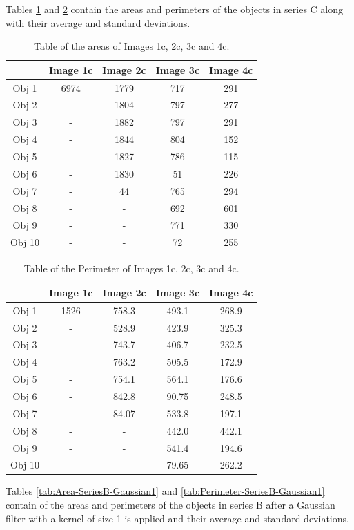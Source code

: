 \documentclass[runningheads]{llncs}
\begin{document}
\newpage
\par Tables \ref{tab:Area-Series C} and \ref{tab:Perimeter-Series C} contain the areas and perimeters of the objects in series C along with their average and standard deviations. 
\begin{table}[h!]
\centering
\begin{tabular}{|c|c|c|c|c|}
\hline
\textbf{} & \textbf{Image 1c} & \textbf{Image 2c} & \textbf{Image 3c} & \textbf{Image 4c} \\
\hline
Obj 1 & 6974     & 1779     & 717 &  291 \\ \hline
Obj 2 &    -        & 1804  & 797 &  277\\ \hline
Obj 3 &   -         & 1882  & 797 &  291\\ \hline
Obj 4 &   -         & 1844  & 804 &  152\\ \hline
Obj 5 &   -         & 1827  & 786 &  115\\ \hline
Obj 6 &   -         & 1830  & 51  &  226\\ \hline
Obj 7 &    -        &   44  & 765 &  294\\ \hline
Obj 8 &   -         &   -   & 692 &  601 \\ \hline
Obj 9 &    -        &  -    & 771 &  330\\ \hline
Obj 10 &   -         &  -   &  72   & 255\\ \hline
\end{tabular}
\caption{Table of the areas of Images 1c, 2c, 3c and 4c.}
\label{tab:Area-Series C}
\end{table}

\begin{table}[h!]
\centering
\begin{tabular}{|c|c|c|c|c|}
\hline
\textbf{} & \textbf{Image 1c} & \textbf{Image 2c} & \textbf{Image 3c} & \textbf{Image 4c} \\
\hline
Obj 1 & 1526  & 758.3   & 493.1 &  268.9 \\ \hline
Obj 2 &    -  & 528.9  & 423.9 &  325.3 \\ \hline
Obj 3 &   -   & 743.7  & 406.7 &  232.5\\ \hline
Obj 4 &   -   & 763.2  & 505.5 &  172.9 \\ \hline
Obj 5 &   -   & 754.1  & 564.1 &  176.6 \\ \hline
Obj 6 &   -   & 842.8  & 90.75  &  248.5 \\ \hline
Obj 7 &    -  & 84.07  & 533.8 &  197.1 \\ \hline
Obj 8 &   -   &   -   & 442.0 &  442.1 \\ \hline
Obj 9 &    -  &  -    & 541.4  &  194.6\\ \hline
Obj 10 &   -  &  -   & 79.65  & 262.2 \\ \hline
\end{tabular}
\caption{Table of the Perimeter of Images 1c, 2c, 3c and 4c.}
\label{tab:Perimeter-Series C}
\end{table}
\newpage
Tables \ref{tab:Area-SeriesB-Gaussian1} and \ref{tab:Perimeter-SeriesB-Gaussian1} contain of the areas and perimeters of the objects in series B after a Gaussian filter with a kernel of size 1 is applied and their average and standard deviations.
\end{document}
